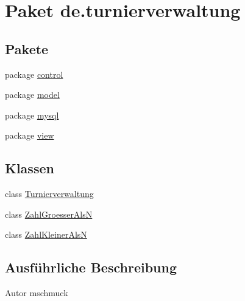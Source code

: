 \hypertarget{namespacede_1_1turnierverwaltung}{}\section{Paket de.\+turnierverwaltung}
\label{namespacede_1_1turnierverwaltung}
\subsection*{Pakete}
\begin{DoxyCompactItemize}
\item 
package \hyperlink{namespacede_1_1turnierverwaltung_1_1control}{control}
\item 
package \hyperlink{namespacede_1_1turnierverwaltung_1_1model}{model}
\item 
package \hyperlink{namespacede_1_1turnierverwaltung_1_1mysql}{mysql}
\item 
package \hyperlink{namespacede_1_1turnierverwaltung_1_1view}{view}
\end{DoxyCompactItemize}
\subsection*{Klassen}
\begin{DoxyCompactItemize}
\item 
class \hyperlink{classde_1_1turnierverwaltung_1_1_turnierverwaltung}{Turnierverwaltung}
\item 
class \hyperlink{classde_1_1turnierverwaltung_1_1_zahl_groesser_als_n}{Zahl\+Groesser\+AlsN}
\item 
class \hyperlink{classde_1_1turnierverwaltung_1_1_zahl_kleiner_als_n}{Zahl\+Kleiner\+AlsN}
\end{DoxyCompactItemize}


\subsection{Ausführliche Beschreibung}
\begin{DoxyAuthor}{Autor}
mschmuck 
\end{DoxyAuthor}
